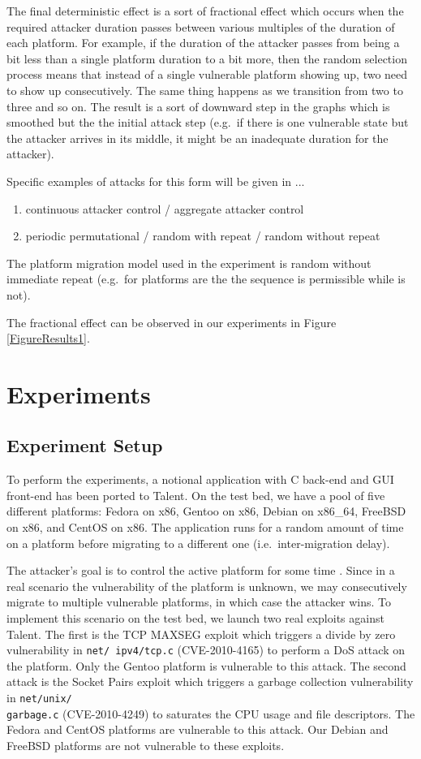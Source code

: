 \documentclass{acm_proc_article-sp}
\begin{document}
The final deterministic effect is a sort of fractional effect which occurs when the required attacker duration 
passes between various multiples of the duration of each platform. For example, if the duration of the attacker passes
from being a bit less than a single platform duration to a bit more, then the random selection
process means that instead of a single vulnerable platform showing up, two need to show up consecutively. The same thing
happens as we transition from two to three and so on. The result is a sort of downward step in the graphs which is
smoothed but the the initial attack step (e.g.~if there is one vulnerable state but the attacker arrives in its middle,
it might be an inadequate duration for the attacker).

Specific examples of attacks for this form will be given in ...
\begin{enumerate}
\item continuous attacker control / aggregate attacker control
\item periodic permutational / random with repeat / random without repeat
\end{enumerate}
The platform migration model used in the experiment is random without immediate repeat (e.g.~for platforms are  the the sequence  is permissible while  is not). 

The fractional effect can be observed in our experiments in Figure \ref{FigureResults1}.

\section{Experiments}
\label{Exper}

\subsection{Experiment Setup}

To perform the experiments, a notional application with C back-end and GUI front-end has been ported to Talent. On the test bed, we have a pool of five different platforms: Fedora on x86, Gentoo on x86, Debian on x86\_64, FreeBSD on x86, and CentOS on x86. The application runs for a random amount of time on a platform before migrating to a different one (i.e.~inter-migration delay). 

The attacker's goal is to control the active platform for some time . Since in a real scenario the vulnerability of the platform is unknown, we may consecutively migrate to multiple vulnerable platforms, in which case the attacker wins. To implement this scenario on the test bed, we launch two real exploits against Talent. The first is the TCP MAXSEG exploit which triggers a divide by zero vulnerability in \texttt{net/ ipv4/tcp.c} (CVE-2010-4165) to perform a DoS attack on the platform. Only the Gentoo platform is vulnerable to this attack. The second attack is the Socket Pairs exploit which triggers a garbage collection vulnerability in \texttt{net/unix/ \\garbage.c} (CVE-2010-4249) to saturates the CPU usage and file descriptors. The Fedora and CentOS platforms are vulnerable to this attack. Our Debian and FreeBSD platforms are not vulnerable to these exploits.
\end{document}
